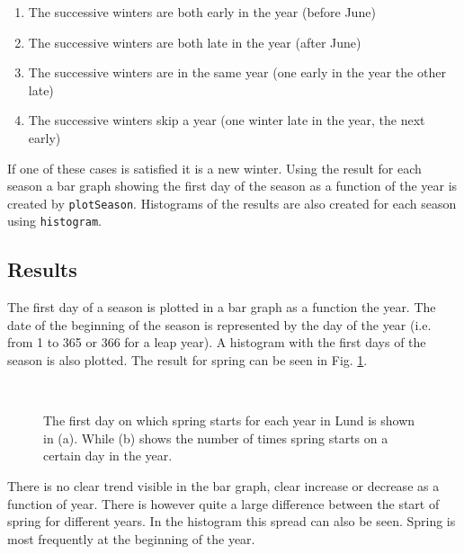 \begin{enumerate}
\item The successive winters are both early in the year (before June)
\item The successive winters are both late in the year (after June)
\item The successive winters are in the same year (one early in the year the other late)
\item The successive winters skip a year (one winter late in the year, the next early)
\end{enumerate}

If one of these cases is satisfied it is a new winter. Using the result for each season a bar graph showing the first day of the season as a function of the year is created by \texttt{plotSeason}. Histograms of the results are also created for each season using \texttt{histogram}. 

\subsection{Results}

The first day of a season is plotted in a bar graph as a function the year. The date of the beginning of the season is represented by the day of the year (i.e. from 1 to 365 or 366 for a leap year). A histogram with the first days of the season is also plotted. The result for spring can be seen in Fig. \ref{fig:spring}. \\

\begin{figure}[ht!]
\centering
{} 
\\
\caption{The first day on which spring starts for each year in Lund is shown in (a).  While (b) shows the number of times spring starts on a certain day in the year.}
\label{fig:spring}
\end{figure}

There is no clear trend visible in the bar graph, clear increase or decrease as a function of year. There is however quite a large difference between the start of spring for different years. In the histogram this spread can also be seen. Spring is most frequently at the beginning of the year. \\

